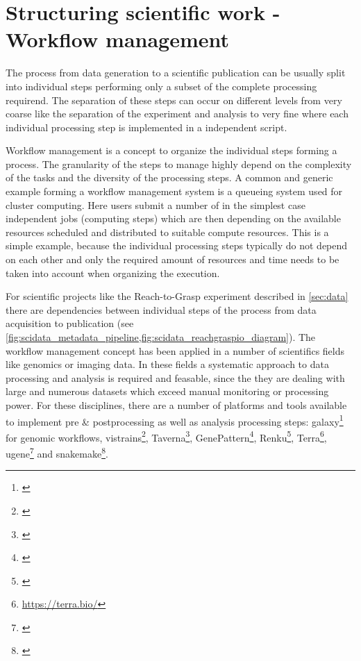 \clearpage
\section{Structuring scientific work - Workflow management}
\label{sec:workflows}

The process from data generation to a scientific publication can be usually split into individual steps performing only a subset of the complete processing requirend. The separation of these steps can occur on different levels from very coarse like the separation of the experiment and analysis to very fine where each individual processing step is implemented in a independent script.

Workflow management is a concept to organize the individual steps forming a process. The granularity of the steps to manage highly depend on the complexity of the tasks and the diversity of the processing steps. A common and generic example forming a workflow management system is a queueing system used for cluster computing. Here users submit a number of in the simplest case independent jobs (computing steps) which are then depending on the available resources scheduled and distributed to suitable compute resources. This is a simple example, because the individual processing steps typically do not depend on each other and only the required amount of resources and time needs to be taken into account when organizing the execution.

For scientific projects like the Reach-to-Grasp experiment described in \cref{sec:data} there are dependencies between individual steps of the process from data acquisition to publication (see \cref{fig:scidata_metadata_pipeline,fig:scidata_reachgraspio_diagram}). The workflow management concept has been applied in a number of scientifics fields like genomics or imaging data. In these fields a systematic approach to data processing and analysis is required and feasable, since the they are dealing with large and numerous datasets which exceed manual monitoring or processing power. 
For these disciplines, there are a number of platforms and tools available to implement pre \& postprocessing as well as analysis processing steps: galaxy\footnote{\url{}} for genomic workflows, vistrains\footnote{\url{}}, Taverna\footnote{\url{}},  GenePattern\footnote{\url{}}, Renku\footnote{\url{}}, Terra\footnote{\url{https://terra.bio/}}, ugene\footnote{\url{}} and snakemake\footnote{\url{}}. 

